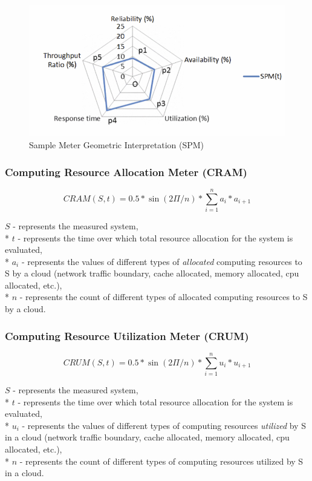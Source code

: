 \documentclass{uvamscse}
\begin{document}
\begin{figure}[h]
\centering
\includegraphics[scale=0.5]{polygon}
\caption{Sample Meter Geometric Interpretation (SPM)}
\label{figure:polygon}
\end{figure}

\subsubsection{Computing Resource Allocation Meter (CRAM)}
\begin{center}
  $$CRAM(S,t) = 0.5 * \sin(2\Pi/n) * \sum_{i=1}^{n}a_i*a_{i+1}$$
\end{center}
  \texttt{$S$} - represents the measured system, \\*
  \texttt{$t$} - represents the time over which total resource allocation for the system is evaluated, \\*
  \texttt{$a_i$} - represents the values of different types of \textit{allocated} computing resources to S by a cloud (network traffic boundary, cache allocated, memory allocated, cpu allocated, etc.), \\*
  \texttt{$n$} - represents the count of different types of allocated computing resources to S by a cloud.

\subsubsection{Computing Resource Utilization Meter (CRUM)}
\begin{center}
  $$CRUM(S,t) = 0.5 * \sin(2\Pi/n) * \sum_{i=1}^{n}u_i*u_{i+1}$$
\end{center}
  \texttt{$S$} - represents the measured system, \\*
  \texttt{$t$} - represents the time over which total resource allocation for the system is evaluated, \\*
  \texttt{$u_i$} - represents the values of different types of computing resources \textit{utilized} by S in a cloud (network traffic boundary, cache allocated, memory allocated, cpu allocated, etc.), \\*
  \texttt{$n$} - represents the count of different types of computing resources utilized by S in a cloud.
\end{document}
